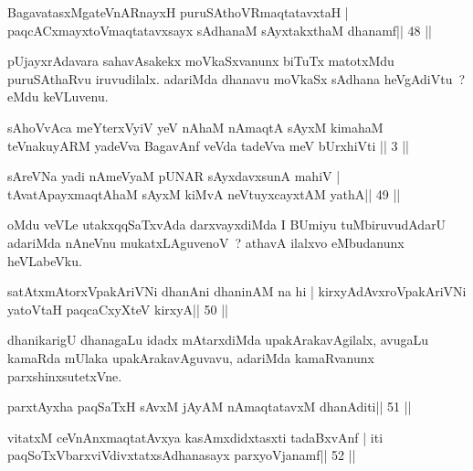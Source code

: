 \begin{shl}
BagavatasxMgateVnARnayxH puruSAthoVR\s maqtatavxtaH |
paqcACxmayxtoV\s maqtatavxsayx sAdhanaM sAyxtakxthaM dhanamf\hfill || 48 ||
\end{shl}

\begin{artha}
pUjayxrAdavara sahavAsakekx moVkaSxvanunx biTuTx matotxMdu puruSAthaRvu iruvudilalx. adariMda dhanavu moVkaSx sAdhana heVgAdiVtu~? eMdu keVLuvenu.
\end{artha}


\begin{kandikeshl}
sAhoVvAca meYterxVyiV yeV nAhaM nAmaqtA sAyxM kimahaM teVnakuyARM yadeVva BagavAnf veVda tadeVva meV bUrxhiVti || 3 ||
\end{kandikeshl}

\begin{shl}
sAreVNa yadi nAmeVyaM pUNAR sAyxdavxsunA mahiV |
tAvatA\s payxmaqtA\s haM sAyxM kiMvA neVtuyxcayxtAM yathA\hfill || 49 ||
\end{shl}

\begin{artha}
oMdu veVLe utakxqqSaTxvAda darxvayxdiMda I BUmiyu tuMbiruvudAdarU adariMda nAneVnu mukatxLAguvenoV~? athavA ilalxvo eMbudanunx heVLabeVku.
\end{artha}

\begin{shl}
satAtxmAtorxVpakAriVNi dhanAni dhaninAM na hi |
kirxyAdAvxroVpakAriVNi yatoV\s taH paqcaCxyXteV kirxyA\hfill || 50 ||
\end{shl}

\begin{artha}
dhanikarigU dhanagaLu idadx mAtarxdiMda upakArakavAgilalx, avugaLu
kamaRda mUlaka upakArakavAguvavu, adariMda kamaRvanunx
parxshinxsutetxVne.
\end{artha}


\begin{shl}
parxtAyxha paqSaTxH sAvxM jAyAM nAmaqtatavxM dhanAditi\hfill || 51 ||
\end{shl}

\begin{shl}
vitatxM ceVnAnxmaqtatAvxya kasAmxdidxtasxti tadaBxvAnf |
iti paqSoTxV\s barxviVdivxtatxsAdhanasayx parxyoVjanamf\hfill || 52 ||
\end{shl}

